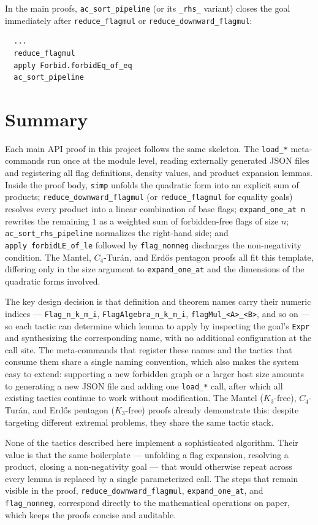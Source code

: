 \documentclass[11pt]{article}
\begin{document}
In the main proofs, \texttt{ac\_sort\_pipeline} (or its \texttt{\_rhs\_}
variant) closes the goal immediately after \texttt{reduce\_flagmul} or
\texttt{reduce\_downward\_flagmul}:

\begin{lstlisting}
  ...
  reduce_flagmul
  apply Forbid.forbidEq_of_eq
  ac_sort_pipeline
\end{lstlisting}

\section{Summary}

Each main API proof in this project follows the same skeleton. The
\texttt{load\_*} meta-commands run once at the module level, reading
externally generated JSON files and registering all flag definitions, density
values, and product expansion lemmas. Inside the proof body, \texttt{simp}
unfolds the quadratic form into an explicit sum of products;
\texttt{reduce\_downward\_flagmul} (or \texttt{reduce\_flagmul} for equality
goals) resolves every product into a linear combination of base flags;
\texttt{expand\_one\_at~n} rewrites the remaining $1$ as a weighted sum of
forbidden-free flags of size $n$; \texttt{ac\_sort\_rhs\_pipeline} normalizes
the right-hand side; and \texttt{apply~forbidLE\_of\_le} followed by
\texttt{flag\_nonneg} discharges the non-negativity condition. The Mantel,
$C_4$-Tur\'an, and Erd\H{o}s pentagon proofs all fit this template, differing
only in the size argument to \texttt{expand\_one\_at} and the dimensions of
the quadratic forms involved.

The key design decision is that definition and theorem names carry their
numeric indices --- \texttt{Flag\_n\_k\_m\_i}, \texttt{FlagAlgebra\_n\_k\_m\_i},
\texttt{flagMul\_<A>\_<B>}, and so on --- so each tactic can determine which
lemma to apply by inspecting the goal's \texttt{Expr} and synthesizing the
corresponding name, with no additional configuration at the call site. The
meta-commands that register these names and the tactics that consume them share
a single naming convention, which also makes the system easy to extend:
supporting a new forbidden graph or a larger host size amounts to generating a
new JSON file and adding one \texttt{load\_*} call, after which all existing
tactics continue to work without modification. The Mantel ($K_3$-free),
$C_4$-Tur\'an, and Erd\H{o}s pentagon ($K_3$-free) proofs already demonstrate
this: despite targeting different extremal problems, they share the same tactic
stack.

None of the tactics described here implement a sophisticated algorithm. Their
value is that the same boilerplate --- unfolding a flag expansion, resolving a
product, closing a non-negativity goal --- that would otherwise repeat across
every lemma is replaced by a single parameterized call. The steps that remain
visible in the proof, \texttt{reduce\_downward\_flagmul},
\texttt{expand\_one\_at}, and \texttt{flag\_nonneg}, correspond directly to the
mathematical operations on paper, which keeps the proofs concise and auditable.
\end{document}
